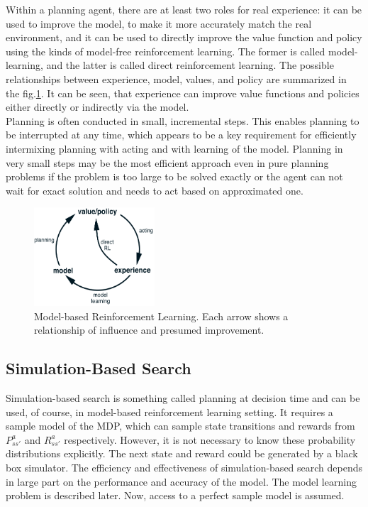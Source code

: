 Within a planning agent, there are at least two roles for real experience: it can be used to improve the model, to make it more accurately match the real environment, and it can be used to directly improve the value function and policy using the kinds of model-free reinforcement learning. The former is called model-learning, and the latter is called direct reinforcement learning. The possible relationships between experience, model, values, and policy are summarized in the fig.\ref{Fig.ModelBasedRL}. It can be seen, that experience can improve value functions and policies either directly or indirectly via the model. \\
Planning is often conducted in small, incremental steps. This enables planning to be interrupted at any time, which appears to be a key requirement for efficiently intermixing planning with acting and with learning of the model. Planning in very small steps may be the most efficient approach even in pure planning problems if the problem is too large to be solved exactly or the agent can not wait for exact solution and needs to act based on approximated one.

\begin{figure}[H]
\includegraphics[width=0.4\textwidth,keepaspectratio]{figures/ModelBasedRL.png}
\caption{Model-based Reinforcement Learning. \protect\cite{Book.RLAI} Each arrow shows a relationship of influence and presumed improvement.}
\label{Fig.ModelBasedRL}
\end{figure}

\subsection{Simulation-Based Search}

Simulation-based search is something called planning at decision time \cite{Book.RLAI} and can be used, of course, in model-based reinforcement learning setting. It requires a sample model of the MDP, which can sample state transitions and rewards from $P^a_{ss'}$ and $R^a_{ss'}$ respectively. However, it is not necessary to know these probability distributions explicitly. The next state and reward could be generated by a black box simulator. The efficiency and effectiveness of simulation-based search depends in large part on the performance and accuracy of the model. The model learning problem is described later. Now, access to a perfect sample model is assumed.

